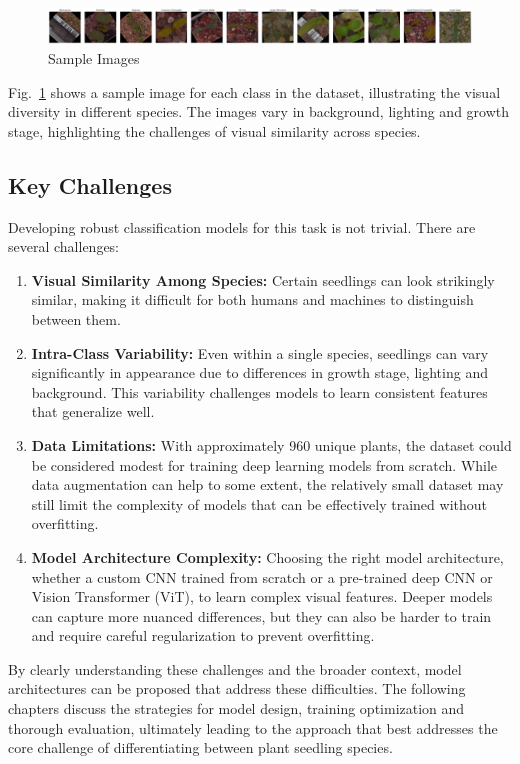\begin{figure}[htbp]
    \centerline{\includegraphics[width=0.9\linewidth]{../../resources/sample_images.png}}
    \caption{Sample Images}
    \label{fig:sample-images}
\end{figure}

Fig.~\ref{fig:sample-images} shows a sample image for each class in the dataset, illustrating the visual diversity in different species. The images vary in background, lighting and growth stage, highlighting the challenges of visual similarity across species.

\subsection{Key Challenges}
Developing robust classification models for this task is not trivial. There are several challenges:

\begin{enumerate}
    \item \textbf{Visual Similarity Among Species:} Certain seedlings can look strikingly similar, making it difficult for both humans and machines to distinguish between them.
    \item \textbf{Intra-Class Variability:} Even within a single species, seedlings can vary significantly in appearance due to differences in growth stage, lighting and background. This variability challenges models to learn consistent features that generalize well.
    \item \textbf{Data Limitations:} With approximately 960 unique plants, the dataset could be considered modest for training deep learning models from scratch. While data augmentation can help to some extent, the relatively small dataset may still limit the complexity of models that can be effectively trained without overfitting.
    \item \textbf{Model Architecture Complexity:} Choosing the right model architecture, whether a custom CNN trained from scratch or a pre-trained deep CNN or Vision Transformer (ViT), to learn complex visual features. Deeper models can capture more nuanced differences, but they can also be harder to train and require careful regularization to prevent overfitting.
\end{enumerate}

By clearly understanding these challenges and the broader context, model architectures can be proposed that address these difficulties. The following chapters discuss the strategies for model design, training optimization and thorough evaluation, ultimately leading to the approach that best addresses the core challenge of differentiating between plant seedling species.